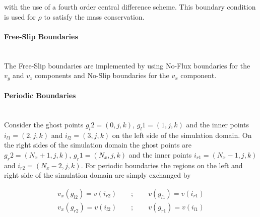 with the use of a fourth order central difference scheme.
This boundary condition is used for $\rho$ to satisfy the mass conservation.

\paragraph{Free-Slip Boundaries}\mbox{}\\

The Free-Slip boundaries are implemented by using No-Flux boundaries for
the $v_y$ and $v_z$ components and No-Slip boundaries for the $v_x$ component.

\paragraph{Periodic Boundaries}\mbox{}\\

Consider the ghost points $g_l2=(0, j, k)$, $g_l1=(1, j, k)$ and the inner points $i_{l1}=(2, j, k)$ and $i_{l2}=(3, j, k)$ on the left side of
the simulation domain.
On the right sides of the simulation domain the ghost points are $g_r2=(N_x+1, j, k)$, $g_r1=(N_x, j, k)$
and the inner points $i_{r1}=(N_x-1, j, k)$ and $i_{r2}=(N_x - 2, j, k)$.
For periodic boundaries the regions on the left and right side of the simulation domain are simply exchanged by

\begin{align}
    v_x(g_{l2}) = v(i_{r2}) \qquad ; \qquad v(g_{l1}) = v(i_{r1})\\
    v_x(g_{r2}) = v(i_{l2}) \qquad ; \qquad v(g_{r1}) = v(i_{l1})
\end{align}


%
%



